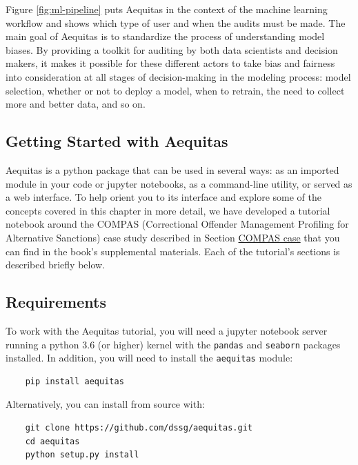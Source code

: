 \documentclass[]{krantz}
\begin{document}
Figure \ref{fig:ml-pipeline} puts Aequitas in the context of the machine
learning workflow and shows which type of user and when the audits must
be made. The main goal of Aequitas is to standardize the process of
understanding model biases. By providing a toolkit for auditing by both
data scientists and decision makers, it makes it possible for these
different actors to take bias and fairness into consideration at all
stages of decision-making in the modeling process: model selection,
whether or not to deploy a model, when to retrain, the need to collect
more and better data, and so on.

\subsection{Getting Started with
Aequitas}\label{getting-started-with-aequitas}

Aequitas is a python package that can be used in several ways: as an
imported module in your code or jupyter notebooks, as a command-line
utility, or served as a web interface. To help orient you to its
interface and explore some of the concepts covered in this chapter in
more detail, we have developed a tutorial notebook around the COMPAS
(Correctional Offender Management Profiling for Alternative Sanctions)
case study described in Section
\protect\hyperlink{sec:compascase}{COMPAS case} that you can find in the
book's supplemental materials. Each of the tutorial's sections is
described briefly below.

\subsection{Requirements}\label{requirements}

To work with the Aequitas tutorial, you will need a jupyter notebook
server running a python 3.6 (or higher) kernel with the \texttt{pandas}
and \texttt{seaborn} packages installed. In addition, you will need to
install the \texttt{aequitas} module:

\begin{verbatim}
    pip install aequitas
\end{verbatim}

Alternatively, you can install from source with:

\begin{verbatim}
    git clone https://github.com/dssg/aequitas.git
    cd aequitas
    python setup.py install
\end{verbatim}
\end{document}
